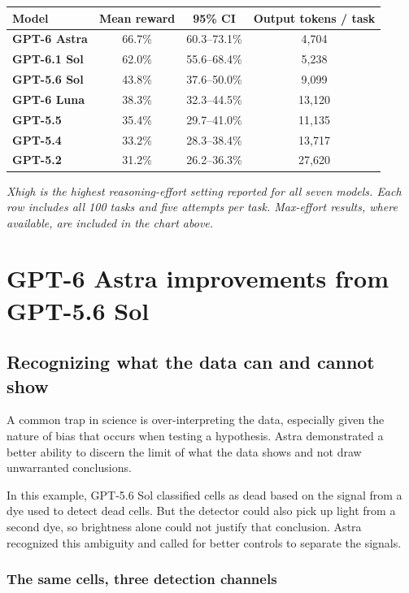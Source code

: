 \documentclass{article}
\newcommand{\figcap}[1]{\vspace{4pt}\par{\noindent\itshape\small #1\par}}
\begin{document}
\begin{table}[H]
  \centering
  \renewcommand{\arraystretch}{1.2}
  \begin{tabular}{lccc}
    \toprule
    \textbf{Model} & \textbf{Mean reward} & \textbf{95\% CI} & \textbf{Output tokens / task} \\
    \midrule
    \textbf{GPT-6 Astra} & 66.7\% & 60.3--73.1\% & 4,704 \\
    \textbf{GPT-6.1 Sol} & 62.0\% & 55.6--68.4\% & 5,238 \\
    \textbf{GPT-5.6 Sol} & 43.8\% & 37.6--50.0\% & 9,099 \\
    \textbf{GPT-6 Luna} & 38.3\% & 32.3--44.5\% & 13,120 \\
    \textbf{GPT-5.5} & 35.4\% & 29.7--41.0\% & 11,135 \\
    \textbf{GPT-5.4} & 33.2\% & 28.3--38.4\% & 13,717 \\
    \textbf{GPT-5.2} & 31.2\% & 26.2--36.3\% & 27,620 \\
    \bottomrule
  \end{tabular}
  \figcap{Xhigh is the highest reasoning-effort setting reported for all seven models. Each row includes all 100 tasks and five attempts per task. Max-effort results, where available, are included in the chart above.}
\end{table}

\section{GPT-6 Astra improvements from GPT-5.6 Sol}

\subsection{Recognizing what the data can and cannot show}

A common trap in science is over-interpreting the data, especially given the nature of bias that occurs when testing a hypothesis. Astra demonstrated a better ability to discern the limit of what the data shows and not draw unwarranted conclusions.

In this example, GPT-5.6 Sol classified cells as dead based on the signal from a dye used to detect dead cells. But the detector could also pick up light from a second dye, so brightness alone could not justify that conclusion. Astra recognized this ambiguity and called for better controls to separate the signals.

\subsubsection*{The same cells, three detection channels}
\end{document}

